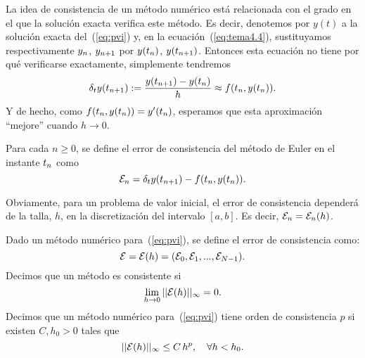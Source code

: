 La idea de consistencia de un método numérico está relacionada con el
grado en el que la solución exacta verifica este método. Es decir,
denotemos por $y(t)$ a la solución exacta del~(\ref{eq:pvi}) y, en la
ecuación~(\ref{eq:tema4.4}), sustituyamos  respectivamente
${y_n}$, ${y_{n+1}}$ por $y({t_n})$, $y({t_{n+1}})$. Entonces esta ecuación no tiene por qué verificarse exactamente, simplemente tendremos
\begin{equation*}
  \delta_t y({t_{n+1}}) :=
  \frac{y({t_{n+1}})-y({t_n})}{h} \approx f({t_n},y({t_n})).
\end{equation*}
Y de hecho, como $f({t_n},y({t_n}))=y'({t_n})$, esperamos que esta aproximación ``mejore'' cuando $h\to 0$.
\begin{definition}
  \label{def:error-consistencia-euler}
  Para cada $n\ge 0$, se define el error de consistencia del método de
  Euler en el instante ${t_n}$ como
  \begin{equation}
    \label{eq:consistencia-euler}
    {\cal E}_{n} = \delta_t y({t_{n+1}})-f({t_n},y({t_n})).
  \end{equation}
\end{definition}
Obviamente, para un problema de valor inicial, el error de
consistencia dependerá de la talla, $h$, en la discretización del
intervalo $[a,b]$. Es decir, ${\cal E}_n={\cal E}_n(h)$.

\begin{definition}
  \label{def:consitencia-metodo-pvi}
  Dado un método numérico para~(\ref{eq:pvi}), se define el error de consistencia
  como:
  \begin{equation*}
    {\cal E} = {\cal E}(h) = ({\cal E}_0, {\cal E}_1,...,{\cal E}_{N-1}).
  \end{equation*}
  Decimos que un método es consistente si
  \begin{equation*}
    \lim_{h\to 0} ||{\cal E}(h)||_\infty = 0.
  \end{equation*}
  Decimos que un método numérico para~(\ref{eq:pvi}) tiene orden de
  consistencia $p$ si existen $C, h_0>0$ tales que
  \begin{equation*}
    ||{\cal E}(h)||_\infty \le C\, h^p, \quad \forall h<h_0.
  \end{equation*}
\end{definition}

